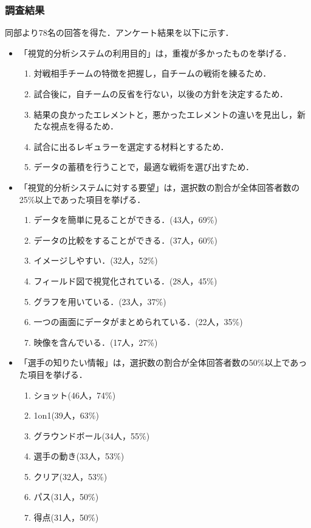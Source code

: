 \documentclass[sotsuron]{kuee}
\begin{document}
			\subsubsection{調査結果}
				同部より78名の回答を得た．アンケート結果を以下に示す．
				\begin{itemize}
					\item 「視覚的分析システムの利用目的」は，重複が多かったものを挙げる．
						\begin{enumerate}
						\item 対戦相手チームの特徴を把握し，自チームの戦術を練るため．
						\item 試合後に，自チームの反省を行ない，以後の方針を決定するため．
						\item 結果の良かったエレメントと，悪かったエレメントの違いを見出し，新たな視点を得るため．
						\item 試合に出るレギュラーを選定する材料とするため．
						\item データの蓄積を行うことで，最適な戦術を選び出すため．
						\end{enumerate}
					\item 「視覚的分析システムに対する要望」は，選択数の割合が全体回答者数の25\%以上であった項目を挙げる．
						\begin{enumerate}
						\item データを簡単に見ることができる．(43人，69\%)
						\item データの比較をすることができる．(37人，60\%)
						\item イメージしやすい．(32人，52\%)
						\item フィールド図で視覚化されている．(28人，45\%)
						\item グラフを用いている．(23人，37\%)
						\item 一つの画面にデータがまとめられている．(22人，35\%)
						\item 映像を含んでいる．(17人，27\%)
						\end{enumerate}
					\item 「選手の知りたい情報」は，選択数の割合が全体回答者数の50\%以上であった項目を挙げる．
						\begin{enumerate}
						\item ショット(46人，74\%)
						\item 1on1(39人，63\%)
						\item グラウンドボール(34人，55\%)
						\item 選手の動き(33人，53\%)
						\item クリア(32人，53\%)
						\item パス(31人，50\%)
						\item 得点(31人，50\%)
						\end{enumerate}
				\end{itemize}
\end{document}
